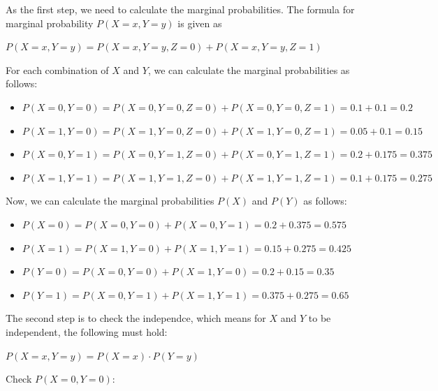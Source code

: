 \documentclass[12pt,letterpaper, onecolumn]{exam}
\begin{document}
\begin{questions}
\begin{parts}
\begin{subparts}
\begin{solution}
                As the first step, we need to calculate the marginal probabilities.
                The formula for marginal probability $P(X=x,Y=y)$ is given as

                \begin{center}
                    $\displaystyle{P(X=x,Y=y) = P(X=x,Y=y,Z=0) + P(X=x,Y=y,Z=1)}$
                \end{center}

                For each combination of $X$ and $Y$, we can calculate the marginal probabilities as follows:

                \begin{itemize}
                    \item $P(X=0,Y=0) = P(X=0,Y=0,Z=0) + P(X=0,Y=0,Z=1) = 0.1 + 0.1 = 0.2$
                    \item $P(X=1,Y=0) = P(X=1,Y=0,Z=0) + P(X=1,Y=0,Z=1) = 0.05 + 0.1 = 0.15$
                    \item $P(X=0,Y=1) = P(X=0,Y=1,Z=0) + P(X=0,Y=1,Z=1) = 0.2 + 0.175 = 0.375$
                    \item $P(X=1,Y=1) = P(X=1,Y=1,Z=0) + P(X=1,Y=1,Z=1) = 0.1 + 0.175 = 0.275$
                \end{itemize}

                Now, we can calculate the marginal probabilities $P(X)$ and $P(Y)$ as follows:

                \begin{itemize}
                    \item $P(X=0) = P(X=0,Y=0) + P(X=0,Y=1) = 0.2 + 0.375 = 0.575$
                    \item $P(X=1) = P(X=1,Y=0) + P(X=1,Y=1) = 0.15 + 0.275 = 0.425$
                    \item $P(Y=0) = P(X=0,Y=0) + P(X=1,Y=0) = 0.2 + 0.15 = 0.35$
                    \item $P(Y=1) = P(X=0,Y=1) + P(X=1,Y=1) = 0.375 + 0.275 = 0.65$
                \end{itemize}

                The second step is to check the independce, which means for $X$ and $Y$ to be independent, the following must hold:

                \begin{center}
                    $\displaystyle{P(X=x,Y=y) = P(X=x) \cdot P(Y=y)}$
                \end{center}
                
                Check $P(X=0,Y=0)$:


\end{solution}
\end{subparts}
\end{parts}
\end{questions}
\end{document}
